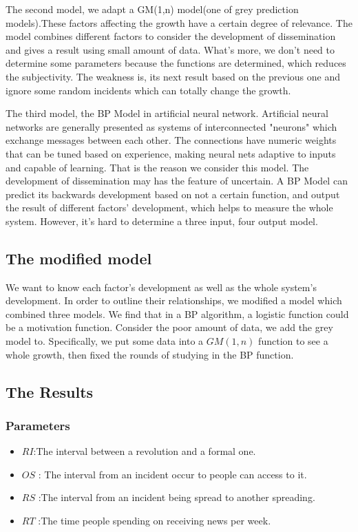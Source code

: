 \par The second model, we adapt a GM(1,n) model(one of grey prediction models).These factors affecting the growth have a certain degree of relevance. The model combines different factors to consider the development of dissemination and gives a result using small amount of data. What's more, we don't need to determine some parameters because the functions are determined, which reduces the subjectivity. The weakness is, its next result based on the previous one and ignore some random incidents which can totally change the growth.
\par The third model, the BP Model in artificial neural network. Artificial neural networks are generally presented as systems of interconnected "neurons" which exchange messages between each other. The connections have numeric weights that can be tuned based on experience, making neural nets adaptive to inputs and capable of learning. That is the reason we consider this model. The development of dissemination may has the feature of uncertain. A BP Model can predict its backwards development based on not a certain function, and output the result of different factors' development, which helps to measure the whole system. However, it's hard to determine a three input, four output model.

\subsection{The modified model}
\par We want to know each factor's development as well as the whole system's development. In order to outline their relationships, we modified a model which combined three models. We find that in a BP algorithm, a logistic function could be a motivation function. Consider the poor amount of data, we add the grey model to. Specifically, we put some data into a $GM(1,n)$ function to see a whole growth, then fixed the rounds of studying in the BP function.
\subsection{The Results}
\subsubsection*{Parameters}
\begin{itemize}
	\item $RI$:The interval between a revolution and a formal one.
	\item $OS$ : The interval from an incident occur to people can access to it.
	\item $RS$ :The interval from an incident being spread to another spreading.
	\item $RT$ :The time people spending on receiving news per week.
\end{itemize}
